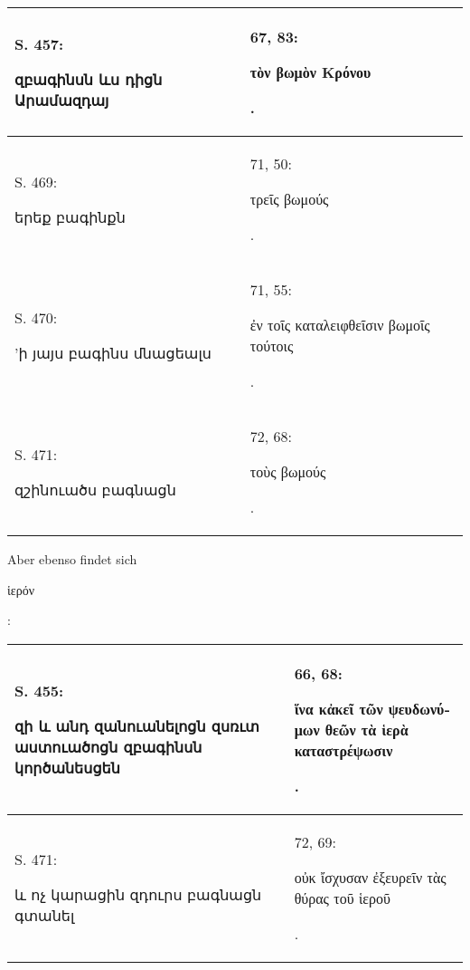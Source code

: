 \documentclass{article}
\begin{document}
{\begin{table}[H]
\begin{tabular}{p{45mm}|p{45mm}}
        S. 457: \begin{armenian}զբագինսն ևս դիցն Արամազդայ\end{armenian} & 67, 83: \begin{greek}τὸν βωμὸν Κρόνου\end{greek}.   \\ \hline
        S. 469: \begin{armenian}երեք բագինքն\end{armenian} & 71, 50: \begin{greek}τρεῖς βωμούς\end{greek}.   \\ \hline
        S. 470: \begin{armenian}'ի յայս բագինս մնացեալս\end{armenian} & 71, 55: \begin{greek}ἐν τοῖς καταλειφθεῖσιν βωμοῖς τούτοις\end{greek}.   \\ \hline
        S. 471: \begin{armenian}զշինուածս բագնացն\end{armenian} & 72, 68: \begin{greek}τοὺς βωμούς\end{greek}. \\ \hline
    \end{tabular}
\end{table}
\hspace*{5mm}Aber ebenso findet sich \begin{greek}ἱερόν\end{greek}:  
\begin{table}[H]
    \centering
    \footnotesize
    \begin{tabular}{p{45mm}|p{45mm}}
    \hline
        S. 455: \begin{armenian}զի և անդ զանուանելոցն զսռւտ աստուածոցն զբագինսն կործանեսցեն\end{armenian} & 66, 68: \begin{greek}ἵνα κἀκεῖ τῶν ψευδωνύμων θεῶν τὰ ἱερὰ καταστρέψωσιν\end{greek}.   \\ \hline
        S. 471: \begin{armenian}և ոչ կարացին զդուրս բագնացն գտանել\end{armenian} & 72, 69: \begin{greek}οὐκ ἴσχυσαν ἐξευρεῖν τὰς θύρας τοῦ ἱεροῦ\end{greek}. \\ \hline
    \end{tabular}

\end{table}}
\end{document}
